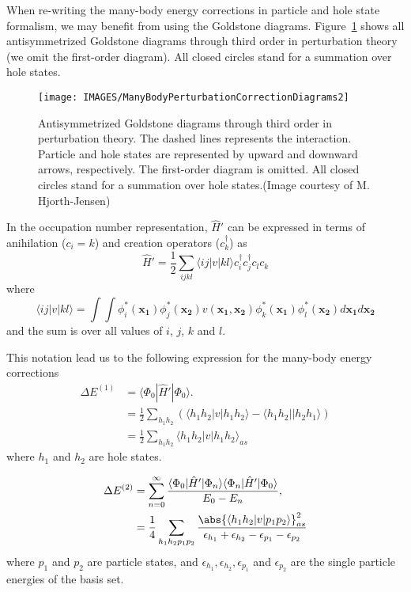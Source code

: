 When re-writing the many-body energy corrections in particle and hole state formalism, we may benefit from using the Goldstone diagrams. Figure~\ref{FeynmanDiagrams} shows all antisymmetrized Goldstone diagrams through third order in perturbation theory (we omit the first-order diagram). All closed circles stand for a summation over hole states.
\begin{figure}
\label{FeynmanDiagrams}
 \centering
\texttt{[image: IMAGES/ManyBodyPerturbationCorrectionDiagrams2]}	
 \caption{Antisymmetrized Goldstone diagrams through third order in perturbation theory. The dashed lines represents the interaction. Particle and hole states are represented by upward and downward arrows, respectively. The first-order diagram is omitted. All closed circles stand for a summation over hole states.(Image courtesy of M. Hjorth-Jensen)}
\end{figure}

In the occupation number representation, $\hat{H}'$ can be expressed in terms of anihilation ($c_i=k$) and creation operators ($c_k^{\dagger}$) as
\begin{equation}
\nonumber
\hat{H}'= \frac{1}{2} \sum_{ijkl} \langle ij | v | kl \rangle c_i^{\dagger} c_j^{\dagger}  c_l c_k
\end{equation}
where 
\begin{equation}
\nonumber
\langle ij | v | kl \rangle = \int \int \phi_i^*(\mathbf{x_1}) \phi_j^*(\mathbf{x_2}) v(\mathbf{x_1},\mathbf{x_2}) \phi_k^*(\mathbf{x_1}) \phi_l^*(\mathbf{x_2}) d\mathbf{x_1} d\mathbf{x_2}
\end{equation}
and the sum is over all values of $i$, $j$, $k$ and $l$.

This notation lead us to the following expression  for the many-body energy corrections
\begin{align}
\label{MBPTcorrections1}
\Delta E^{(1)} &= \langle   \Phi_0  | \hat{H}' | \Phi_0 \rangle. \\ \nonumber
	&= \frac{1}{2}  \sum_{h_1 h_2} (\langle h_1 h_2 |v| h_1 h_2\rangle - \langle h_1 h_2 | | h_2 h_1\rangle ) \\  \nonumber
	&= \frac{1}{2} \sum_{h_1 h_2} \langle h_1 h_2 |v| h_1 h_2\rangle_{as} \nonumber
\end{align}
where $h_1$ and $h_2$ are hole states.

\begin{align}
\label{MBPTcorrections2}
\Delta E^{(2)} &= \sum_{n=0}^{\infty} \frac{\langle \Phi_0 |\hat{H}'| \Phi_n  \rangle \langle \Phi_n |\hat{H}'| \Phi_0 \rangle}{E_0 - E_n}, \\ \nonumber
&= \frac{1}{4} \sum_{h_1 h_2 p_1 p_2} \frac{\abs{\langle h_1 h_2 |v|p_1 p_2 \rangle}_{as}^2}{\epsilon_{h_1}+\epsilon_{h_2}-\epsilon_{p_1}-\epsilon_{p_2}}
\end{align}
where $p_1$ and $p_2$ are particle states, and $\epsilon_{h_1}, \epsilon_{h_2},\epsilon_{p_1}$ and $\epsilon_{p_2}$ are the single particle energies of the basis set.

